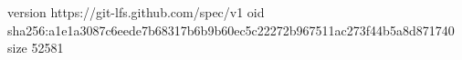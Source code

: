 version https://git-lfs.github.com/spec/v1
oid sha256:a1e1a3087c6eede7b68317b6b9b60ec5c22272b967511ac273f44b5a8d871740
size 52581
